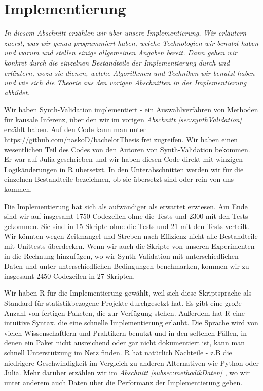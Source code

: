 \documentclass[12pt,a4paper,twoside]{scrartcl}
\numberwithin{equation}{section}
\newcommand{\refsec}[1]{\emph{\hyperref[#1]{Abschnitt \ref*{#1} }}}
\begin{document}
\section{Implementierung}\label{sec:implementierung}
\noindent
\emph{In diesem Abschnitt erzählen wir über unsere Implementierung. Wir erläutern zuerst, was wir genau programmiert haben, welche Technologien wir benutzt haben und warum und stellen einige allgemeinen Angaben bereit. Dann gehen wir konkret durch die einzelnen Bestandteile der Implementierung durch und erläutern, wozu sie dienen, welche Algorithmen und Techniken wir benutzt haben und wie sich die Theorie aus den vorigen Abschnitten in der Implementierung abbildet.}\par

Wir haben Synth-Validation\cite{schuler2017synth} implementiert - ein Auswahlverfahren von Methoden für kausale Inferenz, über den wir im vorigen \refsec{sec:synthValidation} erzählt haben. Auf den Code kann man unter \url{https://github.com/naskoD/bachelorThesis} frei zugreifen. Wir haben einen wesentlichen Teil des Codes von den Autoren von Synth-Validation bekommen. Er war auf Julia geschrieben und wir haben diesen Code direkt mit winzigen Logikänderungen in R übersetzt. In den Unterabschnitten werden wir für die einzelnen Bestandteile bezeichnen, ob sie übersetzt sind oder rein von uns kommen.\par 

\noindent
Die Implementierung hat sich als aufwändiger als erwartet erwiesen. Am Ende sind wir auf insgesamt 1750 Codezeilen ohne die Tests und 2300 mit den Tests gekommen. Sie sind in 15 Skripte ohne die Tests und 21 mit den Tests verteilt. Wir könnten wegen Zeitmangel und Streben nach Effizienz nicht alle Bestandteile mit Unittests überdecken. Wenn wir auch die Skripte von unseren Experimenten in die Rechnung hinzufügen, wo wir Synth-Validation mit unterschiedlichen Daten und unter unterschiedlichen Bedingungen benchmarken, kommen wir zu insgesamt 2450 Codezeilen in 27 Skripten.\par 

\noindent
Wir haben R für die Implementierung gewählt, weil sich diese Skriptsprache als Standard für statistikbezogene Projekte durchgesetzt hat. Es gibt eine große Anzahl von fertigen Paketen, die zur Verfügung stehen. Außerdem hat R eine intuitive Syntax, die eine schnelle Implementierung erlaubt. Die Sprache wird von vielen Wissenschaftlern und Praktikern benutzt und in den seltenen Fällen, in denen ein Paket nicht ausreichend oder gar nicht dokumentiert ist, kann man schnell Unterstützung im Netz finden. R hat natürlich Nachteile -  z.B die niedrigere Geschwindigkeit im Vergleich zu anderen Alternativen wie Python oder Julia. Mehr darüber erzählen wir im \refsec{subsec:methodikDaten}, wo wir unter anderem auch Daten über die Performanz der Implementierung geben.\par    
\end{document}
